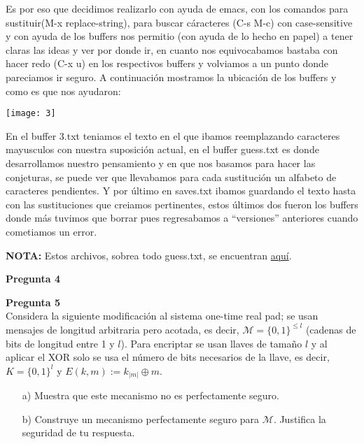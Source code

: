 \documentclass{article}
\newenvironment{problem}[2][Pregunta]
    { \begin{mdframed}[backgroundcolor=gray!20] \textbf{#1 #2} \\}
    {  \end{mdframed}}
\begin{document}
Es por eso que decidimos realizarlo con ayuda de emacs, con los comandos para sustituir(M-x replace-string),
para buscar cáracteres (C-s M-c) con case-sensitive y con ayuda de los buffers nos permitio
(con ayuda de lo hecho en papel) a tener claras las ideas y ver por donde ir, en cuanto nos equivocabamos
bastaba con hacer redo (C-x u) en los respectivos buffers y volviamos a un punto donde
pareciamos ir seguro. A continuación mostramos la ubicación de los buffers y como es que nos ayudaron:


\texttt{[image: 3]}

En el buffer 3.txt teniamos el texto en el que ibamos reemplazando caracteres mayusculos con nuestra
suposición actual, en el buffer guess.txt es donde desarrollamos nuestro pensamiento y en que nos basamos
para hacer las conjeturas, se puede ver que llevabamos para cada sustitución un alfabeto de caracteres pendientes.
Y por último en saves.txt ibamos guardando el texto hasta con las sustituciones que creiamos pertinentes,
estos últimos dos fueron los buffers donde más tuvimos que borrar pues regresabamos a ``versiones'' anteriores
cuando cometiamos un error.


{\large{\bf *NOTA:}} Estos archivos, sobrea todo guess.txt, se encuentran
\href{https://github.com/DiegoMendezMedina/Cripto-Seguridad/tree/main/Tareas/01/src/3}{aquí}.



\begin{problem}{4}
  
\end{problem}

\begin{problem}{5}
  Considera la siguiente modificación al sistema one-time real pad; se usan mensajes de longitud
  arbitraria pero acotada, es decir, $\mathcal{M} = \{0,1\}^{\leq l}$ (cadenas de bits de
  longitud entre 1 y $l$). Para encriptar se usan llaves de tamaño $l$ y
  al aplicar el {\rm XOR} solo se usa el número de bits necesarios de la llave, es decir,
  $K = \{0,1\}^l$ y $E(k,m):=k_{|m|} \oplus m$.

  \begin{enumerate}
  \item[a)] Muestra que este mecanismo no es perfectamente seguro.
    
  \item[b)] Construye un mecanismo perfectamente seguro para $\mathcal{M}$.
    Justifica la seguridad de tu respuesta.
  \end{enumerate}
\end{problem}
\end{document}
